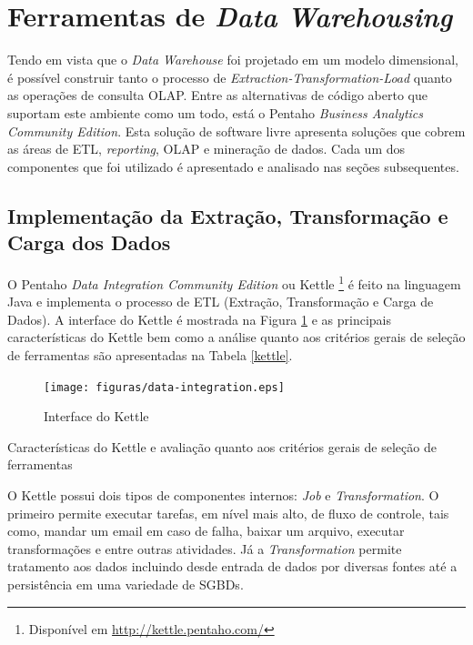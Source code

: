 \section{Ferramentas de \textit{Data Warehousing}}

Tendo em vista que o \textit{Data Warehouse} foi projetado em um modelo dimensional, é possível construir tanto o processo de \textit{Extraction-Transformation-Load} quanto as operações de consulta OLAP. Entre as alternativas de código aberto que suportam este ambiente como um todo, está o Pentaho \textit{Business Analytics Community Edition}. Esta solução de software livre apresenta soluções que cobrem 
as áreas de ETL, \textit{reporting}, OLAP e mineração de dados. Cada um dos componentes que foi utilizado é apresentado e analisado nas seções subsequentes.
 


\subsection{Implementação da Extração, Transformação e Carga dos Dados}
\label{implementação-ETL}
O Pentaho \textit{Data Integration Community Edition} ou Kettle \footnote{Disponível em \url{http://kettle.pentaho.com/}} é feito na linguagem Java e implementa o processo de ETL (Extração, Transformação e Carga de Dados). A interface do Kettle é mostrada na Figura \ref{pdi} e as principais características do Kettle bem como a análise quanto aos critérios gerais de seleção de ferramentas são apresentadas na Tabela \ref{kettle}.

\begin{figure}[ht!]
\centering
\texttt{[image: figuras/data-integration.eps]}
\caption{Interface do Kettle}
\label{pdi}
\end{figure}
\FloatBarrier
 

\begin{table}[!ht]

\caption{Características do Kettle e avaliação quanto aos critérios gerais de seleção de ferramentas}
\label{kettle}
\end{table}
\FloatBarrier	

O Kettle possui dois tipos de componentes internos: \textit{Job} e \textit{Transformation}. O primeiro permite executar tarefas, em nível mais alto, de fluxo de controle, tais como, mandar um email em caso de falha, baixar um arquivo, executar transformações  e entre outras atividades. Já a \textit{Transformation} permite tratamento aos dados incluindo desde entrada de dados por diversas fontes até a persistência em uma variedade de SGBDs.


